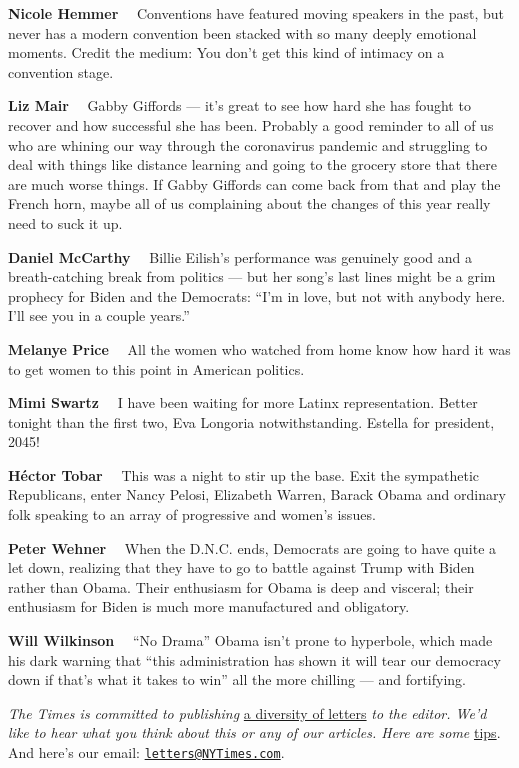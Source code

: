 \textbf{Nicole Hemmer}~~ Conventions have featured moving speakers in
the past, but never has a modern convention been stacked with so many
deeply emotional moments. Credit the medium: You don't get this kind of
intimacy on a convention stage.

\textbf{Liz Mair}~~ Gabby Giffords --- it's great to see how hard she
has fought to recover and how successful she has been. Probably a good
reminder to all of us who are whining our way through the coronavirus
pandemic and struggling to deal with things like distance learning and
going to the grocery store that there are much worse things. If Gabby
Giffords can come back from that and play the French horn, maybe all of
us complaining about the changes of this year really need to suck it up.

\textbf{Daniel McCarthy}~~ Billie Eilish's performance was genuinely
good and a breath-catching break from politics --- but her song's last
lines might be a grim prophecy for Biden and the Democrats: ``I'm in
love, but not with anybody here. I'll see you in a couple years.''

\textbf{Melanye Price}~~ All the women who watched from home know how
hard it was to get women to this point in American politics.

\textbf{Mimi Swartz}~~ I have been waiting for more Latinx
representation. Better tonight than the first two, Eva Longoria
notwithstanding. Estella for president, 2045!

\textbf{Héctor Tobar}~~ This was a night to stir up the base. Exit the
sympathetic Republicans, enter Nancy Pelosi, Elizabeth Warren, Barack
Obama and ordinary folk speaking to an array of progressive and women's
issues.

\textbf{Peter Wehner}~~ When the D.N.C. ends, Democrats are going to
have quite a let down, realizing that they have to go to battle against
Trump with Biden rather than Obama. Their enthusiasm for Obama is deep
and visceral; their enthusiasm for Biden is much more manufactured and
obligatory.

\textbf{Will Wilkinson}~~ ``No Drama'' Obama isn't prone to hyperbole,
which made his dark warning that ``this administration has shown it will
tear our democracy down if that's what it takes to win'' all the more
chilling --- and fortifying.

\emph{The Times is committed to publishing}
\href{https://www.nytimes3xbfgragh.onion/2019/01/31/opinion/letters/letters-to-editor-new-york-times-women.html}{a
diversity of letters} \emph{to the editor. We'd like to hear what you
think about this or any of our articles. Here are some}
\href{https://help.nytimes3xbfgragh.onion/hc/en-us/articles/115014925288-How-to-submit-a-letter-to-the-editor}{tips}.
And here's our email:
\href{mailto:letters@NYTimes.com}{\nolinkurl{letters@NYTimes.com}}.

